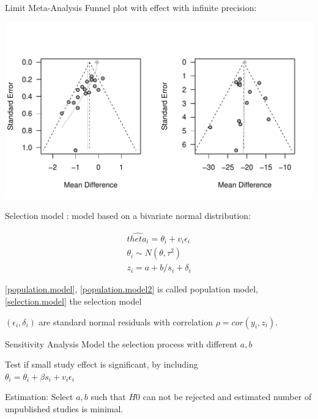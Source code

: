 \documentclass[english]{beamer}\usepackage[]{graphicx}\usepackage[]{color}
\makeatletter
\def\maxwidth{ %
  \ifdim\Gin@nat@width>\linewidth
    \linewidth
  \else
    \Gin@nat@width
  \fi
}
\newenvironment{knitrout}{}{} %
\makeatother
\begin{document}
\begin{frame}[fragile]{Limit Meta-Analysis}
Funnel plot with effect with infinite precision:

\vspace{-1.1cm}
\begin{knitrout}
\color{fgcolor}
\includegraphics[width=\maxwidth]{figure/unnamed-chunk-9-1} 

\end{knitrout}
\end{frame}



\begin{frame}{Selection model}
\citet{Copas1}: model based on a bivariate normal distribution:

\vspace{-8mm}
\begin{align}
\hat{theta_i} = \theta_{i} + v_i\epsilon_i \label{population.model2} \\
\theta_i \sim N(\theta, \tau^2) \label{population.model} \\
z_i = a + b/s_i + \delta_i \label{selection.model}
\end{align}

\ref{population.model}, \ref{population.model2} is called population model, \ref{selection.model} the selection model

$(\epsilon_i, \delta_i)$ are standard normal residuals with correlation $\rho = cor(y_i, z_i)$.
\end{frame}


\begin{frame}[fragile]{Sensitivity Analysis}
Model the selection process with different $a,b$

Test if small study effect is significant, by including \\ $\theta_i = \theta_i + \beta s_i + v_{i}\epsilon_i$

Estimation: Select $a, b$ such that $H0$ can not be rejected and estimated
number of unpublished studies is minimal.
\end{frame}
\end{document}
